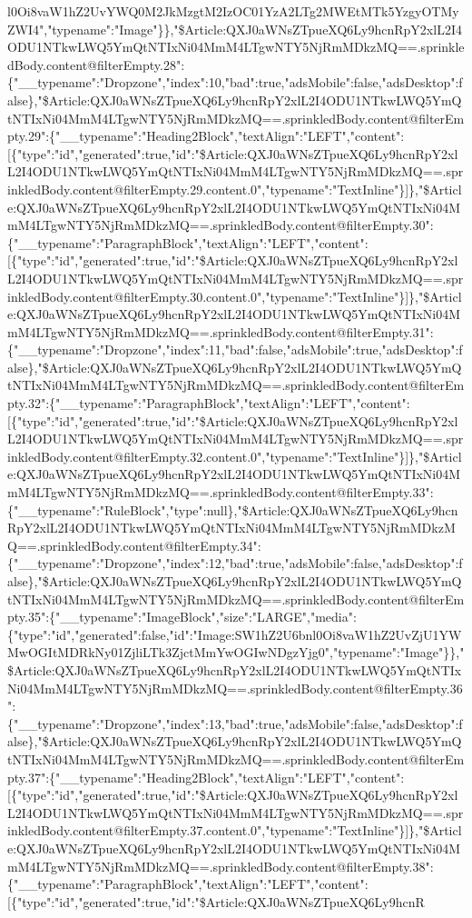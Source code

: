 l0Oi8vaW1hZ2UvYWQ0M2JkMzgtM2IzOC01YzA2LTg2MWEtMTk5YzgyOTMyZWI4","typename":"Image"\}\},"\$Article:QXJ0aWNsZTpueXQ6Ly9hcnRpY2xlL2I4ODU1NTkwLWQ5YmQtNTIxNi04MmM4LTgwNTY5NjRmMDkzMQ==.sprinkledBody.content@filterEmpty.28":\{"\_\_typename":"Dropzone","index":10,"bad":true,"adsMobile":false,"adsDesktop":false\},"\$Article:QXJ0aWNsZTpueXQ6Ly9hcnRpY2xlL2I4ODU1NTkwLWQ5YmQtNTIxNi04MmM4LTgwNTY5NjRmMDkzMQ==.sprinkledBody.content@filterEmpty.29":\{"\_\_typename":"Heading2Block","textAlign":"LEFT","content":{[}\{"type":"id","generated":true,"id":"\$Article:QXJ0aWNsZTpueXQ6Ly9hcnRpY2xlL2I4ODU1NTkwLWQ5YmQtNTIxNi04MmM4LTgwNTY5NjRmMDkzMQ==.sprinkledBody.content@filterEmpty.29.content.0","typename":"TextInline"\}{]}\},"\$Article:QXJ0aWNsZTpueXQ6Ly9hcnRpY2xlL2I4ODU1NTkwLWQ5YmQtNTIxNi04MmM4LTgwNTY5NjRmMDkzMQ==.sprinkledBody.content@filterEmpty.30":\{"\_\_typename":"ParagraphBlock","textAlign":"LEFT","content":{[}\{"type":"id","generated":true,"id":"\$Article:QXJ0aWNsZTpueXQ6Ly9hcnRpY2xlL2I4ODU1NTkwLWQ5YmQtNTIxNi04MmM4LTgwNTY5NjRmMDkzMQ==.sprinkledBody.content@filterEmpty.30.content.0","typename":"TextInline"\}{]}\},"\$Article:QXJ0aWNsZTpueXQ6Ly9hcnRpY2xlL2I4ODU1NTkwLWQ5YmQtNTIxNi04MmM4LTgwNTY5NjRmMDkzMQ==.sprinkledBody.content@filterEmpty.31":\{"\_\_typename":"Dropzone","index":11,"bad":false,"adsMobile":true,"adsDesktop":false\},"\$Article:QXJ0aWNsZTpueXQ6Ly9hcnRpY2xlL2I4ODU1NTkwLWQ5YmQtNTIxNi04MmM4LTgwNTY5NjRmMDkzMQ==.sprinkledBody.content@filterEmpty.32":\{"\_\_typename":"ParagraphBlock","textAlign":"LEFT","content":{[}\{"type":"id","generated":true,"id":"\$Article:QXJ0aWNsZTpueXQ6Ly9hcnRpY2xlL2I4ODU1NTkwLWQ5YmQtNTIxNi04MmM4LTgwNTY5NjRmMDkzMQ==.sprinkledBody.content@filterEmpty.32.content.0","typename":"TextInline"\}{]}\},"\$Article:QXJ0aWNsZTpueXQ6Ly9hcnRpY2xlL2I4ODU1NTkwLWQ5YmQtNTIxNi04MmM4LTgwNTY5NjRmMDkzMQ==.sprinkledBody.content@filterEmpty.33":\{"\_\_typename":"RuleBlock","type":null\},"\$Article:QXJ0aWNsZTpueXQ6Ly9hcnRpY2xlL2I4ODU1NTkwLWQ5YmQtNTIxNi04MmM4LTgwNTY5NjRmMDkzMQ==.sprinkledBody.content@filterEmpty.34":\{"\_\_typename":"Dropzone","index":12,"bad":true,"adsMobile":false,"adsDesktop":false\},"\$Article:QXJ0aWNsZTpueXQ6Ly9hcnRpY2xlL2I4ODU1NTkwLWQ5YmQtNTIxNi04MmM4LTgwNTY5NjRmMDkzMQ==.sprinkledBody.content@filterEmpty.35":\{"\_\_typename":"ImageBlock","size":"LARGE","media":\{"type":"id","generated":false,"id":"Image:SW1hZ2U6bnl0Oi8vaW1hZ2UvZjU1YWMwOGItMDRkNy01ZjliLTk3ZjctMmYwOGIwNDgzYjg0","typename":"Image"\}\},"\$Article:QXJ0aWNsZTpueXQ6Ly9hcnRpY2xlL2I4ODU1NTkwLWQ5YmQtNTIxNi04MmM4LTgwNTY5NjRmMDkzMQ==.sprinkledBody.content@filterEmpty.36":\{"\_\_typename":"Dropzone","index":13,"bad":true,"adsMobile":false,"adsDesktop":false\},"\$Article:QXJ0aWNsZTpueXQ6Ly9hcnRpY2xlL2I4ODU1NTkwLWQ5YmQtNTIxNi04MmM4LTgwNTY5NjRmMDkzMQ==.sprinkledBody.content@filterEmpty.37":\{"\_\_typename":"Heading2Block","textAlign":"LEFT","content":{[}\{"type":"id","generated":true,"id":"\$Article:QXJ0aWNsZTpueXQ6Ly9hcnRpY2xlL2I4ODU1NTkwLWQ5YmQtNTIxNi04MmM4LTgwNTY5NjRmMDkzMQ==.sprinkledBody.content@filterEmpty.37.content.0","typename":"TextInline"\}{]}\},"\$Article:QXJ0aWNsZTpueXQ6Ly9hcnRpY2xlL2I4ODU1NTkwLWQ5YmQtNTIxNi04MmM4LTgwNTY5NjRmMDkzMQ==.sprinkledBody.content@filterEmpty.38":\{"\_\_typename":"ParagraphBlock","textAlign":"LEFT","content":{[}\{"type":"id","generated":true,"id":"\$Article:QXJ0aWNsZTpueXQ6Ly9hcnR